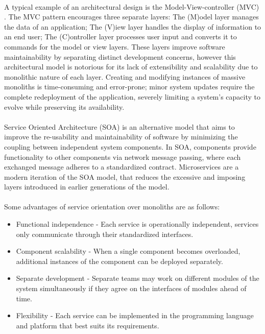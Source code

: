 \paragraph{}

A typical example of an architectural design is the Model-View-controller (MVC) \cite{mvc, microservices}.
The MVC pattern encourages three separate layers: The (M)odel layer manages the data of an application;
The (V)iew layer handles the display of information to an end user; The (C)ontroller layer
processes user input and converts it to commands for the model or view layers.
These layers improve software maintainability by separating distinct development concerns,
however this architectural model is notorious for its lack of extensibility and scalability due to monolithic nature of each layer.
Creating and modifying instances of massive monoliths is time-consuming and error-prone;
minor system updates require the complete redeployment of the application, severely limiting a system's capacity to evolve while preserving its availability.

\paragraph{}

Service Oriented Architecture (SOA) \cite{7} is an alternative model that aims to
improve the re-usability and maintainability of software by minimizing the coupling between independent system components.
In SOA, components provide functionality to other components via network message passing, where each exchanged message adheres to a standardized contract.
Microservices \cite{microservices} are a modern iteration of the SOA model,
that reduces the excessive and imposing layers introduced in earlier generations of the model.

\paragraph{}

Some advantages of service orientation over monoliths are as follows:
\begin{itemize}
    \item Functional independence - Each service is operationally independent, services only communicate through their standardized interfaces.
    \item Component scalability - When a single component becomes overloaded, additional instances of the component can be deployed separately.
    \item Separate development - Separate teams may work on different modules of the system simultaneously if they agree on the interfaces of modules ahead of time.
    \item Flexibility - Each service can be implemented in the programming language and platform that best suits its requirements.
\end{itemize}

